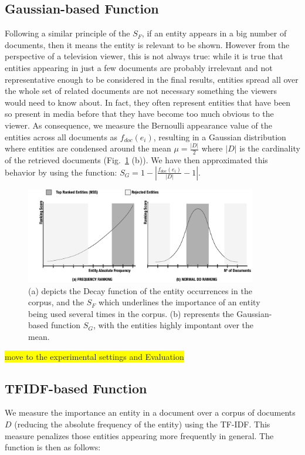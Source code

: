 \documentclass{llncs}
\newcommand{\hg}[1]{\colorbox{yellow}{#1}}
\begin{document}
\subsection{Gaussian-based Function}
Following a similar principle of the $S_F$, if an entity appears in a big number of documents, then it means the entity is relevant to be shown. However from the perspective of a television viewer, this is not always true: while it is true that entities appearing in just a few documents are probably irrelevant and not representative enough to be considered in the final results, entities spread all over the whole set of related documents are not necessary something the viewers would need to know about. In fact, they often represent entities that have been so present in media before that they have become too much obvious to the viewer. As consequence, we measure the Bernoulli appearance value of the entities across all documents as $f_{doc}(e_i)$, resulting in a Gaussian distribution where entities are condensed around the mean $\mu = \frac{|D|}{2}$ where $|D|$ is the cardinality of the retrieved documents (Fig.~\ref{fig:rankingStrategies} (b)). We have then approximated this behavior by using the function: $S_G = 1-\left | \frac{ f_{doc}(e_i) }{|D|} -1 \right |$.

\begin{figure}[h!]
\centering
\includegraphics[width=0.9\textwidth]{figure/RankingStrategies}
\caption{(a) depicts the Decay function of the entity occurrences in the corpus, and the $S_F$ which underlines the importance of an entity being used several times in the corpus. (b) represents the Gaussian-based function $S_G$, with the entities highly impontant over the mean.}
\label{fig:rankingStrategies}%
\end{figure}

\hg{move to the experimental settings and Evaluation}
\subsection{TFIDF-based Function}
We measure the importance an entity in a document over a corpus of documents $D$ (reducing the absolute frequency of the entity) using the TF-IDF. This measure penalizes those entities appearing more frequently in general. The function is then as follows:
\end{document}
